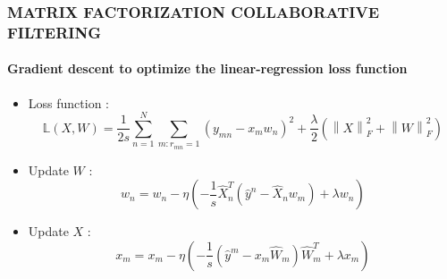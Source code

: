 \documentclass[11pt]{beamer}
\begin{document}
\begin{frame}
\frametitle{\textbf{MATRIX FACTORIZATION COLLABORATIVE FILTERING}}
\framesubtitle{\textbf{Gradient descent to optimize the linear-regression loss function}}
\begin{itemize}
	\pause\item Loss function :
	$$ \mathbb{L}(X,W) = \dfrac{1}{2s}\sum_{n=1}^{N}\sum_{m:r_{mn}=1}(y_{mn}-x_mw_n)^2+\dfrac{\lambda}{2}\left(\left\|X\right\|^2_F+\left\|W\right\|^2_F\right) $$
	\pause\item Update $W$ : 
	$$w_n = w_n - \eta\left(-\dfrac{1}{s}\hat{X}^T_n(\hat{y}^n-\hat{X}_nw_m)+ \lambda w_n\right) $$
	\pause\item Update $X$ : 
	$$x_m = x_m - \eta\left(-\dfrac{1}{s}(\hat{y}^m-x_m\hat{W}_m)\hat{W}^T_m + \lambda x_m\right) $$
\end{itemize}
\end{frame}
\end{document}
